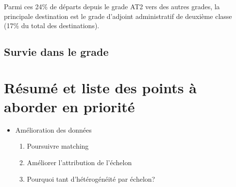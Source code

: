 \documentclass[11pt,a4paper]{article}
\begin{document}
Parmi ces 24\% de départs depuis le grade AT2 vers des autres grades, la principale destination est le grade d'adjoint administratif de deuxième classe (17\% du total des destinations). 




\subsection{Survie dans le grade}





\section{Résumé et liste des points à aborder en priorité}


\begin{itemize}
\item Amélioration des données 
\begin{enumerate}
\item Poursuivre matching
\item Améliorer l'attribution de l'échelon
\item Pourquoi tant d'hétérogénéité par échelon? 
\end{enumerate}
\end{itemize}
\end{document}
